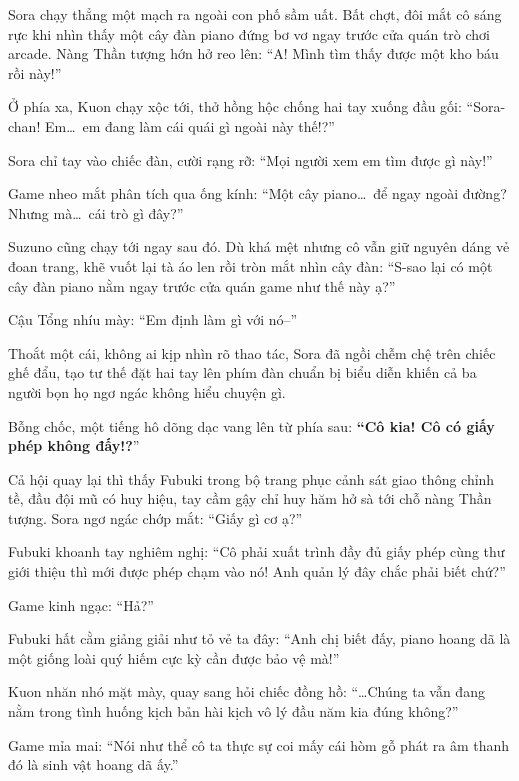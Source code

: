 \documentclass[../main.tex]{subfiles}
\begin{document}
\ct

Sora chạy thẳng một mạch ra ngoài con phố sầm uất. Bất chợt, đôi mắt cô sáng rực khi nhìn thấy một cây đàn piano đứng bơ vơ ngay trước cửa quán trò chơi arcade. Nàng Thần tượng hớn hở reo lên: ``A! Mình tìm thấy được một kho báu rồi này!''


Ở phía xa, Kuon chạy xộc tới, thở hồng hộc chống hai tay xuống đầu gối: ``Sora-chan! Em\dots\ em đang làm cái quái gì ngoài này thế!?''

Sora chỉ tay vào chiếc đàn, cười rạng rỡ: ``Mọi người xem em tìm được gì này!''

Game nheo mắt phân tích qua ống kính: ``Một cây piano\dots\ để ngay ngoài đường? Nhưng mà\dots\ cái trò gì đây?''

Suzuno cũng chạy tới ngay sau đó. Dù khá mệt nhưng cô vẫn giữ nguyên dáng vẻ đoan trang, khẽ vuốt lại tà áo len rồi tròn mắt nhìn cây đàn: ``S-sao lại có một cây đàn piano nằm ngay trước cửa quán game như thế này ạ?''

Cậu Tổng nhíu mày: ``Em định làm gì với nó--''

Thoắt một cái, không ai kịp nhìn rõ thao tác, Sora đã ngồi chễm chệ trên chiếc ghế đẩu, tạo tư thế đặt hai tay lên phím đàn chuẩn bị biểu diễn khiến cả ba người bọn họ ngơ ngác không hiểu chuyện gì.

Bỗng chốc, một tiếng hô dõng dạc vang lên từ phía sau: \textbf{``Cô kia! Cô có giấy phép không đấy!?}''

Cả hội quay lại thì thấy Fubuki trong bộ trang phục cảnh sát giao thông chỉnh tề, đầu đội mũ có huy hiệu, tay cầm gậy chỉ huy hăm hở sà tới chỗ nàng Thần tượng. Sora ngơ ngác chớp mắt: ``Giấy gì cơ ạ?''


Fubuki khoanh tay nghiêm nghị: ``Cô phải xuất trình đầy đủ giấy phép cùng thư giới thiệu thì mới được phép chạm vào nó! Anh quản lý đây chắc phải biết chứ?''

Game kinh ngạc: ``Hả?''

Fubuki hất cằm giảng giải như tỏ vẻ ta đây: ``Anh chị biết đấy, piano hoang dã là một giống loài quý hiếm cực kỳ cần được bảo vệ mà!''

Kuon nhăn nhó mặt mày, quay sang hỏi chiếc đồng hồ: ``\dots Chúng ta vẫn đang nằm trong tình huống kịch bản hài kịch vô lý đầu năm kia đúng không?''

Game mỉa mai: ``Nói như thể cô ta thực sự coi mấy cái hòm gỗ phát ra âm thanh đó là sinh vật hoang dã ấy.''
\end{document}
